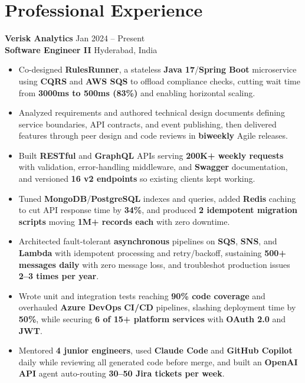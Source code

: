 \documentclass[a4paper,10pt]{article}
\begin{document}
\section*{Professional Experience}

\textbf{Verisk Analytics} \hfill Jan 2024 -- Present \\
\textbf{Software Engineer II} \hfill Hyderabad, India

\begin{itemize}[leftmargin=*]
    \item Co-designed \textbf{RulesRunner}, a stateless \textbf{Java 17}/\textbf{Spring Boot} microservice using \textbf{CQRS} and \textbf{AWS SQS} to offload compliance checks, cutting wait time from \textbf{3000ms to 500ms (83\%)} and enabling horizontal scaling.
    \item Analyzed requirements and authored technical design documents defining service boundaries, API contracts, and event publishing, then delivered features through peer design and code reviews in \textbf{biweekly} Agile releases.
    \item Built \textbf{RESTful} and \textbf{GraphQL} APIs serving \textbf{200K+ weekly requests} with validation, error-handling middleware, and \textbf{Swagger} documentation, and versioned \textbf{16 v2 endpoints} so existing clients kept working.
    \item Tuned \textbf{MongoDB}/\textbf{PostgreSQL} indexes and queries, added \textbf{Redis} caching to cut API response time by \textbf{34\%}, and produced \textbf{2 idempotent migration scripts} moving \textbf{1M+ records each} with zero downtime.
    \item Architected fault-tolerant \textbf{asynchronous} pipelines on \textbf{SQS}, \textbf{SNS}, and \textbf{Lambda} with idempotent processing and retry/backoff, sustaining \textbf{500+ messages daily} with zero message loss, and troubleshot production issues \textbf{2--3 times per year}.
    \item Wrote unit and integration tests reaching \textbf{90\% code coverage} and overhauled \textbf{Azure DevOps} \textbf{CI/CD} pipelines, slashing deployment time by \textbf{50\%}, while securing \textbf{6 of 15+ platform services} with \textbf{OAuth 2.0} and \textbf{JWT}.
    \item Mentored \textbf{4 junior engineers}, used \textbf{Claude Code} and \textbf{GitHub Copilot} daily while reviewing all generated code before merge, and built an \textbf{OpenAI API} agent auto-routing \textbf{30--50 Jira tickets per week}.
\end{itemize}
\end{document}
